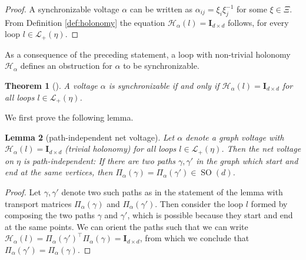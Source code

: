 \documentclass[10pt,reqno]{amsart}
\numberwithin{equation}{section}
\theoremstyle{bfnote}
\newtheorem{theorem}{Theorem}[section]
\newtheorem{lemma}[theorem]{Lemma}
\theoremstyle{bfdef}
\newcommand{\mc}[1]{\mathcal{#1}}
\newcommand{\II}{\mathbf{I}_{d \times d}}
\DeclareMathOperator{\SO}{SO}
\providecommand\gt; %
\renewcommand{\gt}{\xi}
\providecommand\a; %
\renewcommand{\a}{\alpha}
\providecommand\Hol; %
\renewcommand{\Hol}{\mc{H}}
\providecommand\Lps; %
\renewcommand{\Lps}{\mc{L}}
\begin{document}
	\begin{proof}
		A synchronizable voltage $\a$ can be written as $\a_{i j} = \gt_{i} \gt_{j}^{-1}$ for some $\gt \in \Xi$. From Definition \ref{def:holonomy} the equation $\Hol_{\a}(l) = \II$ follows, for every loop $l \in \Lps_{+}(\eta)$.
	\end{proof}
	As a consequence of the preceding statement, a loop with non-trivial holonomy $\Hol_{\alpha}$ defines an obstruction for $\a$ to be synchronizable.

	\begin{theorem}[{\cite[Corollary 2.1]{gaoGeometrySynchronizationProblems2019}}]
	\label{thm:holonomy-obstruction}
		A voltage $\a$ is synchronizable if and only if $\Hol_\a(l) = \II$ for all loops $l \in \Lps_+(\eta)$.
	\end{theorem}

	We first prove the following lemma.
	\begin{lemma}[path-independent net voltage]\label{lem:path-indep-pt}
		Let $\a$ denote a graph voltage with $\Hol_{\a}(l) = \II$ (trivial holonomy) for all loops $l \in \Lps_{+}(\eta)$. Then the net voltage on $\eta$ is path-independent: If there are two paths $\gamma, \gamma'$ in the graph which start and end at the same vertices, then $\Pi_{\a}(\gamma) = \Pi_\a(\gamma') \in \SO(d)$.
	\end{lemma}
	\begin{proof}
		Let $\gamma,\gamma'$ denote two such paths as in the statement of the lemma with transport matrices $\Pi_{\a}(\gamma)$ and $\Pi_{\a}(\gamma')$. Then consider the loop $l$ formed by composing the two paths $\gamma$ and $\gamma'$, which is possible because they start and end at the same points. We can orient the paths such that we can write $\Hol_{\a}(l) = \Pi_{\a}(\gamma')^{\top} \Pi_{\a}(\gamma) = \II$, from which we conclude that $\Pi_{\a}(\gamma') = \Pi_\a(\gamma)$.
	\end{proof}
\end{document}

